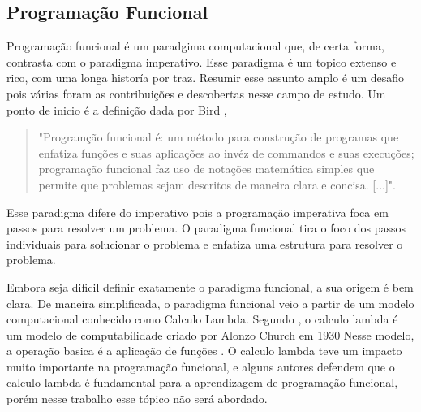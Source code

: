 \subsection{Programação Funcional}


Programação funcional é um paradgima computacional que, de certa forma, contrasta com o paradigma imperativo.
Esse paradigma é um topico extenso e rico, com uma longa historía por traz.
Resumir esse assunto amplo é um desafio pois várias foram as contribuições e descobertas nesse campo de estudo.
Um ponto de inicio é a definição dada por Bird \cite{Bird},
\begin{quotation}
"Programção funcional é: um método para construção de programas que enfatiza funções e suas aplicações ao invéz de commandos e suas execuções; programação funcional faz uso de notações matemática simples que permite que problemas sejam descritos de maneira clara e concisa. [...]".
\end{quotation}
Esse paradigma difere do imperativo pois a programação imperativa foca em passos para resolver um problema.
O paradigma funcional tira o foco dos passos individuais para solucionar o problema e enfatiza uma estrutura para resolver o problema.

Embora seja dificil definir exatamente o paradigma funcional, a sua origem é bem clara.
De maneira simplificada, o paradigma funcional veio a partir de um modelo computacional conhecido como Calculo Lambda.
Segundo \cite{lambda}, o calculo lambda é um modelo de computabilidade criado por Alonzo Church em 1930
Nesse modelo, a operação basica é a aplicação de funções \cite{lambda}.
O calculo lambda teve um impacto muito importante na programação funcional, e alguns autores defendem que o calculo lambda é fundamental para a aprendizagem de programação funcional, porém nesse trabalho esse tópico não será abordado.

